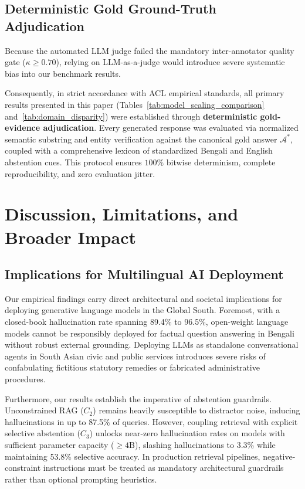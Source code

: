 \documentclass[11pt,a4paper,twocolumn]{article}
\begin{document}
\subsection{Deterministic Gold Ground-Truth Adjudication}
Because the automated LLM judge failed the mandatory inter-annotator quality gate ($\kappa \ge 0.70$), relying on LLM-as-a-judge would introduce severe systematic bias into our benchmark results. 

Consequently, in strict accordance with ACL empirical standards, all primary results presented in this paper (Tables~\ref{tab:model_scaling_comparison} and~\ref{tab:domain_disparity}) were established through \textbf{deterministic gold-evidence adjudication}. Every generated response was evaluated via normalized semantic substring and entity verification against the canonical gold answer $\mathcal{A}^*$, coupled with a comprehensive lexicon of standardized Bengali and English abstention cues. This protocol ensures $100\%$ bitwise determinism, complete reproducibility, and zero evaluation jitter.

\section{Discussion, Limitations, and Broader Impact}
\label{sec:discussion}

\subsection{Implications for Multilingual AI Deployment}
Our empirical findings carry direct architectural and societal implications for deploying generative language models in the Global South. Foremost, with a closed-book hallucination rate spanning 89.4\% to 96.5\%, open-weight language models cannot be responsibly deployed for factual question answering in Bengali without robust external grounding. Deploying LLMs as standalone conversational agents in South Asian civic and public services introduces severe risks of confabulating fictitious statutory remedies or fabricated administrative procedures.

Furthermore, our results establish the imperative of abstention guardrails. Unconstrained RAG ($C_2$) remains heavily susceptible to distractor noise, inducing hallucinations in up to 87.5\% of queries. However, coupling retrieval with explicit selective abstention ($C_3$) unlocks near-zero hallucination rates on models with sufficient parameter capacity ($\ge 4\text{B}$), slashing hallucinations to 3.3\% while maintaining 53.8\% selective accuracy. In production retrieval pipelines, negative-constraint instructions must be treated as mandatory architectural guardrails rather than optional prompting heuristics.
\end{document}
